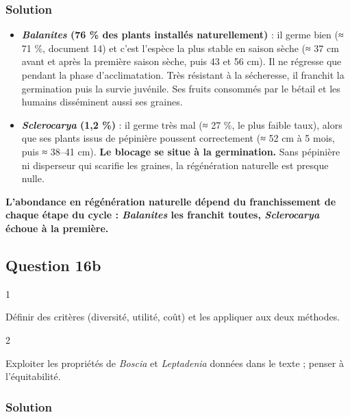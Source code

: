\documentclass[11pt,a4paper]{article}
\providecommand{\tightlist}{\setlength{\itemsep}{0pt}\setlength{\parskip}{0pt}}
\begin{document}
\hypertarget{solution-45}{%
\subsubsection{Solution}\label{solution-45}}

\begin{itemize}
\tightlist
\item
  \textbf{\emph{Balanites} (76 \% des plants installés naturellement)} : il germe bien (≈ 71 \%, document 14) et c'est l'espèce la plus stable en saison sèche (≈ 37 cm avant et après la première saison sèche, puis 43 et 56 cm). Il ne régresse que pendant la phase d'acclimatation. Très résistant à la sécheresse, il franchit la germination puis la survie juvénile. Ses fruits consommés par le bétail et les humains disséminent aussi ses graines.
\item
  \textbf{\emph{Sclerocarya} (1,2 \%)} : il germe très mal (≈ 27 \%, le plus faible taux), alors que ses plants issus de pépinière poussent correctement (≈ 52 cm à 5 mois, puis ≈ 38--41 cm). \textbf{Le blocage se situe à la germination.} Sans pépinière ni disperseur qui scarifie les graines, la régénération naturelle est presque nulle.
\end{itemize}

\textbf{L'abondance en régénération naturelle dépend du franchissement de chaque étape du cycle : \emph{Balanites} les franchit toutes, \emph{Sclerocarya} échoue à la première.}

\hypertarget{question-16b}{%
\subsection{Question 16b}\label{question-16b}}

\begin{indication}{1}

Définir des critères (diversité, utilité, coût) et les appliquer aux deux méthodes.

\end{indication}

\begin{indication}{2}

Exploiter les propriétés de \emph{Boscia} et \emph{Leptadenia} données dans le texte ; penser à l'équitabilité.

\end{indication}

\hypertarget{solution-46}{%
\subsubsection{Solution}\label{solution-46}}
\end{document}
